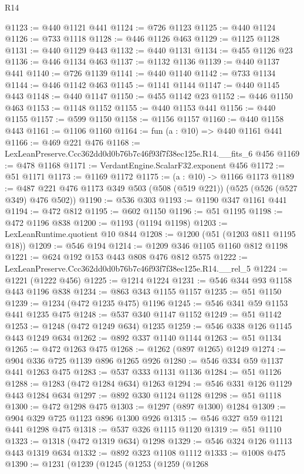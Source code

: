 \begin{lexlean}{R14}
\begin{coremodule}
@1123 := @440 @1121 @441
@1124 := @726 @1123
@1125 := @440 @1124
@1126 := @733 @1118
@1128 := @446 @1126 @463
@1129 := @1125 @1128
@1131 := @440 @1129 @443
@1132 := @440 @1131
@1134 := @455 @1126 @23
@1136 := @446 @1134 @463
@1137 := @1132 @1136
@1139 := @440 @1137 @441
@1140 := @726 @1139
@1141 := @440 @1140
@1142 := @733 @1134
@1144 := @446 @1142 @463
@1145 := @1141 @1144
@1147 := @440 @1145 @443
@1148 := @440 @1147
@1150 := @455 @1142 @23
@1152 := @446 @1150 @463
@1153 := @1148 @1152
@1155 := @440 @1153 @441
@1156 := @440 @1155
@1157 := @599 @1150
@1158 := @1156 @1157
@1160 := @440 @1158 @443
@1161 := @1106 @1160
@1164 := fun (a : @10) => @440 @1161 @441
@1166 := @469 @221 @476
@1168 := LexLeanPreserve.Ccc362dd0d0b76b7c46f93f7f38ec125e.R14.__fits_6 @456
@1169 := @478 @1168
@1171 := VerdantEngine.ScalarF32.exponent @456
@1172 := @51 @1171
@1173 := @1169 @1172
@1175 := (a : @10) -> @1166 @1173
@1189 := @487 @221 @476 @1173 @349 @503 (@508 (@519 @221)) (@525 (@526 (@527 @349) @476 @502))
@1190 := @536 @303
@1193 := @1190 @347 @1161 @441
@1194 := @472 @812
@1195 := @602 @1150
@1196 := @51 @1195
@1198 := @472 @1196 @838
@1200 := @1193 (@1194 @1198)
@1203 := LexLeanRuntime.quotient @10 @844
@1208 := @1200 (@51 (@1203 @811 @1195 @18))
@1209 := @546 @194
@1214 := @1209 @346 @1105 @1160 @812 @1198
@1221 := @624 @192 @153 @443 @808 @476 @812 @575
@1222 := LexLeanPreserve.Ccc362dd0d0b76b7c46f93f7f38ec125e.R14.__rel_5
@1224 := @1221 (@1222 @456)
@1225 := @1214 @1224
@1231 := @546 @344 @93 @1158 @443 @1196 @838
@1234 := @863 @343 @1155 @1157
@1235 := @51 @1150
@1239 := @1234 (@472 @1235 @475) @1196
@1245 := @546 @341 @59 @1153 @441 @1235 @475
@1248 := @537 @340 @1147 @1152
@1249 := @51 @1142
@1253 := @1248 (@472 @1249 @634) @1235
@1259 := @546 @338 @126 @1145 @443 @1249 @634
@1262 := @892 @337 @1140 @1144
@1263 := @51 @1134
@1265 := @472 @1263 @475
@1268 := @1262 (@897 @1265) @1249
@1274 := @904 @336 @725 @1139 @896 @1265 @926
@1280 := @546 @334 @59 @1137 @441 @1263 @475
@1283 := @537 @333 @1131 @1136
@1284 := @51 @1126
@1288 := @1283 (@472 @1284 @634) @1263
@1294 := @546 @331 @126 @1129 @443 @1284 @634
@1297 := @892 @330 @1124 @1128
@1298 := @51 @1118
@1300 := @472 @1298 @475
@1303 := @1297 (@897 @1300) @1284
@1309 := @904 @329 @725 @1123 @896 @1300 @926
@1315 := @546 @327 @59 @1121 @441 @1298 @475
@1318 := @537 @326 @1115 @1120
@1319 := @51 @1110
@1323 := @1318 (@472 @1319 @634) @1298
@1329 := @546 @324 @126 @1113 @443 @1319 @634
@1332 := @892 @323 @1108 @1112
@1333 := @1008 @475
@1390 := @1231
    (@1239
      (@1245
        (@1253
          (@1259
            (@1268

\end{coremodule}
\end{lexlean}
